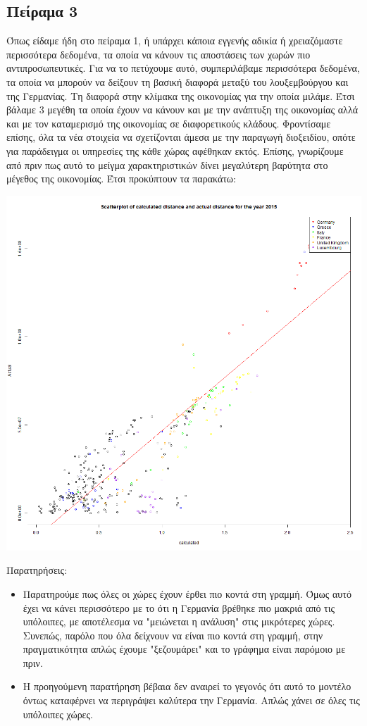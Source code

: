 \documentclass[a4paper,twoside,10pt]{article}
\begin{document}
	\subsection{Πείραμα 3}
	
	Όπως είδαμε ήδη στο πείραμα 1, ή υπάρχει κάποια εγγενής αδικία ή χρειαζόμαστε περισσότερα δεδομένα, τα οποία να κάνουν τις αποστάσεις των χωρών πιο αντιπροσωπευτικές. Για να το πετύχουμε αυτό, συμπεριλάβαμε περισσότερα δεδομένα, τα οποία να μπορούν να δείξουν τη βασική διαφορά μεταξύ του λουξεμβούργου και της Γερμανίας. Τη διαφορά στην κλίμακα της οικονομίας για την οποία μιλάμε. Έτσι βάλαμε 3 μεγέθη τα οποία έχουν να κάνουν και με την ανάπτυξη της οικονομίας αλλά και με τον καταμερισμό της οικονομίας σε διαφορετικούς κλάδους. Φροντίσαμε επίσης, όλα τα νέα στοιχεία να σχετίζονται άμεσα με την παραγωγή διοξειδίου, οπότε για παράδειγμα οι υπηρεσίες της κάθε χώρας αφέθηκαν εκτός. Επίσης, γνωρίζουμε από πριν πως αυτό το μείγμα χαρακτηριστικών δίνει μεγαλύτερη βαρύτητα στο μέγεθος της οικονομίας. Έτσι προκύπτουν τα παρακάτω:
	
	\includegraphics[width = \textwidth]{images/scatterplot_with_regression_line_ 2015 _with_all_data_.png}
	
	Παρατηρήσεις:
	\begin{itemize}
		\item Παρατηρούμε πως όλες οι χώρες έχουν έρθει πιο κοντά στη γραμμή. Όμως αυτό έχει να κάνει περισσότερο με το ότι η Γερμανία βρέθηκε πιο μακριά από τις υπόλοιπες, με αποτέλεσμα να "μειώνεται η ανάλυση" στις μικρότερες χώρες. Συνεπώς, παρόλο που όλα δείχνουν να είναι πιο κοντά στη γραμμή, στην πραγματικότητα απλώς έχουμε "ξεζουμάρει" και το γράφημα είναι παρόμοιο με πριν.
		\item Η προηγούμενη παρατήρηση βέβαια δεν αναιρεί το γεγονός ότι αυτό το μοντέλο όντως καταφέρνει να περιγράψει καλύτερα την Γερμανία. Απλώς χάνει σε όλες τις υπόλοιπες χώρες.
	\end{itemize}
	
\end{document}
